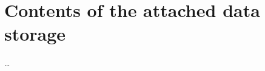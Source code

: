 \documentclass[english,zadani,odsaz]{fitthesis}
\begin{document}
\makeatletter
\def\@openbib@code{\addcontentsline{toc}{chapter}{Bibliography}}
\makeatother


\begin{flushleft}

\end{flushleft}
\iftwoside\cleardoublepage\fi

\appendix
\appendixpage
\iftwoside\cleardoublepage\fi

\startcontents[chapters]
\iftwoside\cleardoublepage\fi

\chapter{Contents of the attached data storage}
\label{sec:orgf914ee3}
\ldots{}
\end{document}

